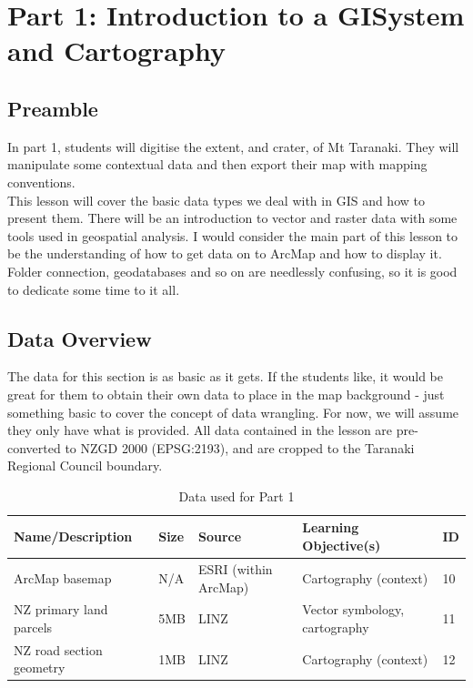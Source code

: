 \documentclass{article}
\begin{document}
\section{Part 1: Introduction to a GISystem and Cartography}
\subsection{Preamble}
In part 1, students will digitise the extent, and crater, of Mt Taranaki. They will manipulate some contextual data and then export their map with mapping conventions. \\

This lesson will cover the basic data types we deal with in GIS and how to present them. There will be an introduction to vector and raster data with some tools used in geospatial analysis. I would consider the main part of this lesson to be the understanding of how to get data on to ArcMap and how to display it. Folder connection, geodatabases and so on are needlessly confusing, so it is good to dedicate some time to it all. 

\subsection{Data Overview}
The data for this section is as basic as it gets. If the students like, it would be great for them to obtain their own data to place in the map background - just something basic to cover the concept of data wrangling. For now, we will assume they only have what is provided. All data contained in the lesson are pre-converted to NZGD 2000 (EPSG:2193), and are cropped to the Taranaki Regional Council boundary. 

\begin{table}[h]
\begin{center}
    \begin{tabular}{ | m{4cm} | m{1cm}| m{3.5cm} | m{5cm} | m{1cm} | } 
    \hline
    \cellcolor{red!35!blue!33!green!33!}\textbf{Name/Description} & 
    \cellcolor{red!35!blue!33!green!33!}\textbf{Size} &
    \cellcolor{red!35!blue!33!green!33!}\textbf{Source} &
    \cellcolor{red!35!blue!33!green!33!}\textbf{Learning Objective(s)} &
    \cellcolor{red!35!blue!33!green!33!}\textbf{ID} \\
    \hline
    ArcMap basemap & N/A & ESRI (within ArcMap) & Cartography (context) & 10 \\
    \hline
    NZ primary land parcels & 5MB & LINZ & Vector symbology, cartography & 11 \\
    \hline
    NZ road section geometry & 1MB & LINZ & Cartography (context) & 12 \\
    \hline
    \end{tabular}
\end{center}
\caption{\label{tb_data_1}Data used for Part 1}
\end{table}
\end{document}
